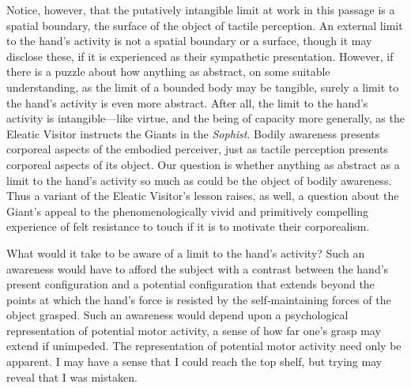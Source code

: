 Notice, however, that the putatively intangible limit at work in this passage is a spatial boundary, the surface of the object of tactile perception. An external limit to the hand's activity is not a spatial boundary or a surface, though it may disclose these, if it is experienced as their sympathetic presentation. However, if there is a puzzle about how anything as abstract, on some suitable understanding, as the limit of a bounded body may be tangible, surely a limit to the hand's activity is even more abstract. After all, the limit to the hand's activity is intangible---like virtue, and the being of capacity more generally, as the Eleatic Visitor instructs the Giants in the \emph{Sophist}. Bodily awareness presents corporeal aspects of the embodied perceiver, just as tactile perception presents corporeal aspects of its object. Our question is whether anything as abstract as a limit to the hand's activity so much as could be the object of bodily awareness. Thus a variant of the Eleatic Visitor's lesson raises, as well, a question about the Giant's appeal to the phenomenologically vivid and primitively compelling experience of felt resistance to touch if it is to motivate their corporealism.

What would it take to be aware of a limit to the hand's activity? Such an awareness would have to afford the subject with a contrast between the hand's present configuration and a potential configuration that extends beyond the points at which the hand's force is resisted by the self-maintaining forces of the object grasped. Such an awareness would depend upon a psychological representation of potential motor activity, a sense of how far one's grasp may extend if unimpeded. The representation of potential motor activity need only be apparent. I may have a sense that I could reach the top shelf, but trying may reveal that I was mistaken.

